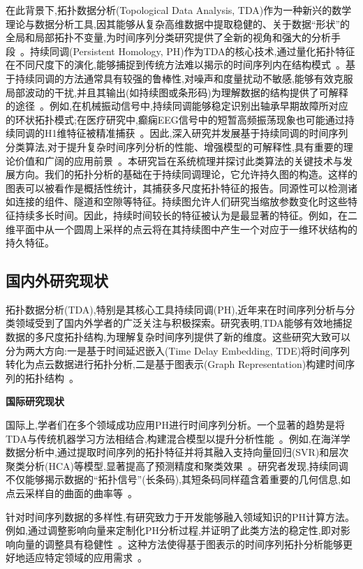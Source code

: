 在此背景下,拓扑数据分析(Topological Data Analysis, TDA)\cite{JSJC20250411004}作为一种新兴的数学理论与数据分析工具,因其能够从复杂高维数据中提取稳健的、关于数据“形状”的全局和局部拓扑不变量,为时间序列分类研究提供了全新的视角和强大的分析手段~。持续同调(Persistent Homology, PH)作为TDA的核心技术,通过量化拓扑特征在不同尺度下的演化,能够捕捉到传统方法难以揭示的时间序列内在结构模式~。基于持续同调的方法通常具有较强的鲁棒性,对噪声和度量扰动不敏感,能够有效克服局部波动的干扰,并且其输出(如持续图或条形码)为理解数据的结构提供了可解释的途径~。例如,在机械振动信号中,持续同调能够稳定识别出轴承早期故障所对应的环状拓扑模式;在医疗研究中,癫痫EEG信号中的短暂高频振荡现象也可能通过持续同调的H1维特征被精准捕获~。因此,深入研究并发展基于持续同调的时间序列分类算法,对于提升复杂时间序列分析的性能、增强模型的可解释性,具有重要的理论价值和广阔的应用前景~。本研究旨在系统梳理并探讨此类算法的关键技术与发展方向。我们的拓扑分析的基础在于持续同调理论，它允许持久图的构造。这样的图表可以被看作是概括性统计，其捕获多尺度拓扑特征的报告\cite{fasy2014confidence}。同源性可以检测诸如连接的组件、隧道和空隙等特征。持续图允许人们研究当缩放参数变化时这些特征持续多长时间。因此，持续时间较长的特征被认为是最显著的特征。例如，在二维平面中从一个圆周上采样的点云将在其持续图中产生一个对应于一维环状结构的持久特征。


\subsection{国内外研究现状}
拓扑数据分析(TDA),特别是其核心工具持续同调(PH),近年来在时间序列分析与分类领域受到了国内外学者的广泛关注与积极探索。研究表明,TDA能够有效地捕捉数据的多尺度拓扑结构,为理解复杂时间序列提供了新的维度。这些研究大致可以分为两大方向:一是基于时间延迟嵌入(Time Delay Embedding, TDE)将时间序列转化为点云数据进行拓扑分析,二是基于图表示(Graph Representation)构建时间序列的拓扑结构~。

\textbf{国际研究现状}

国际上,学者们在多个领域成功应用PH进行时间序列分析。一个显著的趋势是将TDA与传统机器学习方法相结合,构建混合模型以提升分析性能~。例如,在海洋学数据分析中,通过提取时间序列的拓扑特征并将其融入支持向量回归(SVR)和层次聚类分析(HCA)等模型,显著提高了预测精度和聚类效果~。\cite{lin2025hybridizing}研究者发现,持续同调不仅能够揭示数据的“拓扑信号”(长条码),其短条码同样蕴含着重要的几何信息,如点云采样自的曲面的曲率等~。

针对时间序列数据的多样性,有研究致力于开发能够融入领域知识的PH计算方法。\cite{2}例如,通过调整影响向量来定制化PH分析过程,并证明了此类方法的稳定性,即对影响向量的调整具有稳健性~。这种方法使得基于图表示的时间序列拓扑分析能够更好地适应特定领域的应用需求~。


